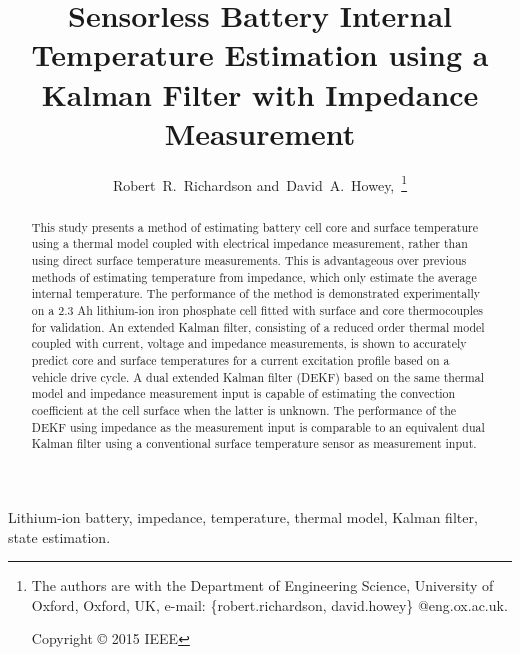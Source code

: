\documentclass[journal, english]{IEEEtran}
\begin{document}
\author{Robert~R.~Richardson
	and~David~A.~Howey,~\thanks{The authors are with the Department
		of Engineering Science, University of Oxford, Oxford, 
		UK, e-mail: \{robert.richardson, david.howey\} @eng.ox.ac.uk.
		
		Copyright \copyright \hspace{0.01 cm} 2015 IEEE}}




\title{Sensorless Battery Internal Temperature Estimation using a Kalman Filter with
Impedance Measurement}

\maketitle

\begin{abstract}
This study presents a method of estimating battery cell core and surface temperature using a thermal model coupled with electrical impedance measurement, rather than using direct surface temperature measurements. This is advantageous over previous methods of estimating temperature from impedance, which only estimate the average internal temperature. The performance of the method is demonstrated experimentally on a 2.3 Ah lithium-ion iron phosphate cell fitted with surface and core thermocouples for validation. An extended Kalman filter, consisting of a reduced order thermal model coupled with current, voltage and impedance measurements, is shown to accurately predict core and surface temperatures for a current excitation profile
based on a vehicle drive cycle. A dual extended Kalman filter (DEKF) based on the same thermal model and impedance measurement input is capable of estimating the convection coefficient at the cell surface when the latter is unknown. The performance of the DEKF using impedance as the measurement input is comparable to an equivalent dual Kalman filter using a conventional surface
temperature sensor as measurement input.\end{abstract}
\begin{IEEEkeywords}
Lithium-ion battery, impedance, temperature, thermal model, Kalman filter, state estimation.
\end{IEEEkeywords}
\end{document}

